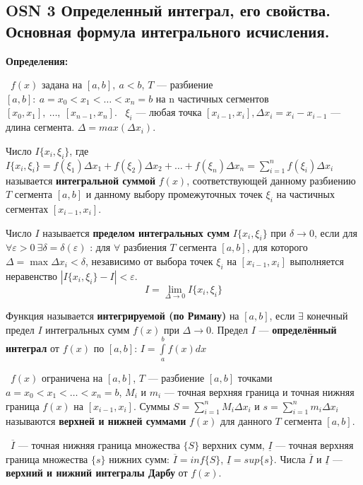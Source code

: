 \subsection*{OSN 3 Определенный интеграл, его свойства. Основная формула интегрального исчисления.}

\textbf{Определения:}

\mathLet \ $f(x)$ задана на $[a,b],~a<b$, $T$ --- разбиение $[a,b]:~a=x_0 < x_1 < \dots < x_n = b$ на n частичных сегментов $[x_0,x_1],~\dots,~[x_{n-1},x_n]$. \mathLet \ $\xi_i$  --- любая точка $[x_{i-1}, x_i], \Delta x_i = x_i - x_{i-1}$ --- длина сегмента. $\Delta = max(\Delta x_i)$.

\bigbreak
Число $I\{x_i, \xi_i\}$, где
$I\{x_i,\xi_i\} = f(\xi_1) \Delta x_1 + f(\xi_2) \Delta x_2 + \dots + f(\xi_n) \Delta x_n = \displaystyle\sum_{i=1}^n f(\xi_i) \Delta x_i$ называется \textbf{интегральной суммой} $f(x)$, соответствующей данному разбиению $T$ сегмента $[a, b]$ и данному выбору промежуточных точек $\xi_i$ на частичных сегментах $[x_{i-1}, x_i]$.

\bigbreak
Число $I$ называется \textbf{пределом интегральных сумм} $I\{x_i, \xi_i\}$ при $\delta \to 0$, если для $\forall \varepsilon > 0~\exists \delta = \delta(\varepsilon)$ : для $\forall$ разбиения $T$ сегмента $[a, b]$, для которого $\Delta  = \max \Delta x_i < \delta$, независимо от выбора точек $\xi_i$ на $[x_{i-1}, x_i]$ выполняется неравенство $|I\{x_i, \xi_i\} - I| < \varepsilon$.
$$I = \lim\limits_{\Delta \to 0} I\{x_i,\xi_i\} $$

\bigbreak
Функция называется \textbf{интегрируемой (по Риману)} на $[a, b]$, если $\exists$ конечный предел $I$ интегральных сумм $f(x)$ при $\Delta \to 0$. Предел $I$ --- \textbf{определённый интеграл} от $f(x)$ по $[a,b]$: $I = \int\limits_a^b f(x)dx$

\bigbreak
\mathLet \ $f(x)$ ограничена на $[a, b]$, $T$ --- разбиение $[a, b]$ точками $a = x_0 < x_1 < \dots < x_n = b$, $M_i$ и $m_i$ --- точная верхняя граница и точная нижняя граница $f(x)$ на $[x_{i-1}, x_i]$. Суммы $S = \sum_{i=1}^n M_i\Delta x_i$ и $s = \sum_{i=1}^n m_i\Delta x_i$ называются \textbf{верхней и нижней суммами} $f(x)$ для данного $T$ сегмента $[a,b]$.

\bigbreak
\mathLet \ $\overline{I}$ --- точная нижняя граница множества $\{S\}$ верхних сумм, $\underline{I}$ --- точная верхняя граница множества $\{s\}$ нижних сумм: $\overline{I} = inf\{S\}$, $\underline{I} = sup\{s\}$. Числа $\overline{I}$ и $\underline{I}$ --- \textbf{верхний и нижний интегралы Дарбу} от $f(x)$.

